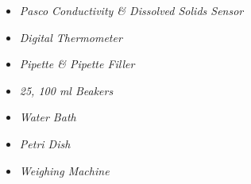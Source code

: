 \begin{itemize}
    \item \textit{Pasco Conductivity \& Dissolved Solids Sensor}
    \item \textit{Digital Thermometer}
    \item \textit{Pipette \& Pipette Filler}
    \item \textit{25, 100 ml Beakers}
    \item \textit{Water Bath}
    \item \textit{Petri Dish}
    \item \textit{Weighing Machine}
    \label{app}
\end{itemize}

